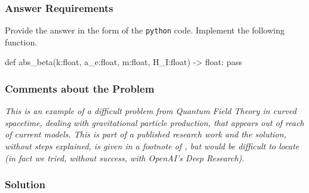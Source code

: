 \subsubsection*{Answer Requirements}
Provide the answer in the form of the \texttt{python} code. Implement the following function.
\begin{python}
def abs_beta(k:float, a_e:float, m:float, H_I:float) -> float:
    pass
\end{python}

\subsubsection*{Comments about the Problem}

\textit{This is an example of a difficult problem from Quantum Field Theory in curved spacetime, dealing with gravitational particle production, that appears out of reach of current models. This is part of a published research work and the solution, without steps explained, is given in a footnote of \cite{Basso:2022tpd}, but would be difficult to locate (in fact we tried, without success, with OpenAI's Deep Research). 
}
\subsubsection*{Solution}


